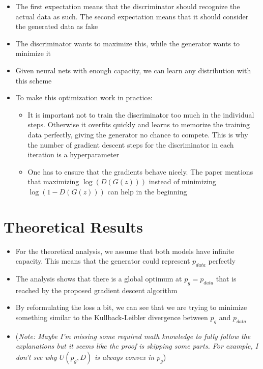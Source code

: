 \documentclass{article}
\begin{document}
\begin{itemize}
    \item The first expectation means that the discriminator should recognize the actual data as such. The second expectation means that it should consider the generated data as fake
    \item The discriminator wants to maximize this, while the generator wants to minimize it
    \item Given neural nets with enough capacity, we can learn any distribution with this scheme
    \item To make this optimization work in practice:
    \begin{itemize}
        \item It is important not to train the discriminator too much in the individual steps. Otherwise it overfits quickly and learns to memorize the training data perfectly, giving the generator no chance to compete. This is why the number of gradient descent steps for the discriminator in each iteration is a hyperparameter
        \item One has to ensure that the gradients behave nicely. The paper mentions that maximizing $\log(D(G(z)))$ instead of minimizing $\log(1 - D(G(z)))$ can help in the beginning
    \end{itemize}
\end{itemize}

\section{Theoretical Results}

\begin{itemize}
    \item For the theoretical analysis, we assume that both models have infinite capacity. This means that the generator could represent $p_{\mathit{data}}$ perfectly
    \item The analysis shows that there is a global optimum at $p_g = p_{\mathit{data}}$ that is reached by the proposed gradient descent algorithm
    \item By reformulating the loss a bit, we can see that we are trying to minimize something similar to the Kullback-Leibler divergence between $p_g$ and $p_{\mathit{data}}$
    \item (\emph{Note: Maybe I'm missing some required math knowledge to fully follow the explanations but it seems like the proof is skipping some parts. For example, I don't see why $U(p_g, D)$ is always convex in $p_g$})
\end{itemize}
\end{document}
